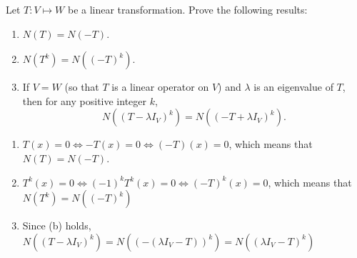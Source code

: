 \begin{homeworkProblem}

Let $T: V \mapsto W$ be a linear transformation. Prove the following results:

\begin{enumerate}
  \item $N(T) = N(-T)$.
  \item $N(T^k) = N((-T)^k)$.
  \item If $V = W$ (so that $T$ is a linear operator on $V$) and $\lambda$ is an eigenvalue of $T$, then for any positive integer $k$,
  \[
    N((T - \lambda I_V)^k) = N((-T + \lambda I_V)^k).
  \]
\end{enumerate}

\solution

\begin{enumerate}
  \item $T(x) = 0 \Longleftrightarrow -T(x) = 0 \Longleftrightarrow (-T)(x) = 0$, which means that $N(T) = N(-T)$.
  \item $T^k(x) = 0 \Longleftrightarrow (-1)^k T^k (x) = 0 \Longleftrightarrow (-T)^k (x) = 0$, which means that $N(T^k) = N((-T)^k)$
  \item Since (b) holds, $N((T-\lambda I_V)^k) = N((-(\lambda I_V - T))^k) = N((\lambda I_V - T)^k)$
\end{enumerate}

\end{homeworkProblem}
